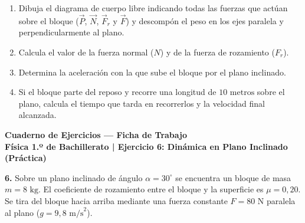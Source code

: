 ﻿\documentclass[11pt,a4paper]{article}
\begin{document}
\begin{enumerate}[label=\textbf{\alph*)}, leftmargin=2em, itemsep=7pt]
    \item Dibuja el diagrama de cuerpo libre indicando todas las fuerzas que actúan sobre el bloque ($\vec{P}$, $\vec{N}$, $\vec{F}_r$ y $\vec{F}$) y descompón el peso en los ejes paralela y perpendicularmente al plano.
    \item Calcula el valor de la fuerza normal ($N$) y de la fuerza de rozamiento ($F_r$).
    \item Determina la aceleración con la que sube el bloque por el plano inclinado.
    \item Si el bloque parte del reposo y recorre una longitud de $10\text{ metros}$ sobre el plano, calcula el tiempo que tarda en recorrerlos y la velocidad final alcanzada.
\end{enumerate}

\newpage

\begin{center}
    {\LARGE \textbf{Cuaderno de Ejercicios — Ficha de Trabajo}}\\[4pt]
    {\large \textbf{Física 1.º de Bachillerato | Ejercicio 6: Dinámica en Plano Inclinado (Práctica)}}
\end{center}

\vspace{0.3cm}
\noindent\textbf{6.} Sobre un plano inclinado de ángulo $\alpha = 30^\circ$ se encuentra un bloque de masa $m = 8\text{ kg}$. El coeficiente de rozamiento entre el bloque y la superficie es $\mu = 0{,}20$. Se tira del bloque hacia arriba mediante una fuerza constante $F = 80\text{ N}$ paralela al plano ($g = 9{,}8\text{ m/s}^2$).

\begin{center}
\end{center}
\end{document}
